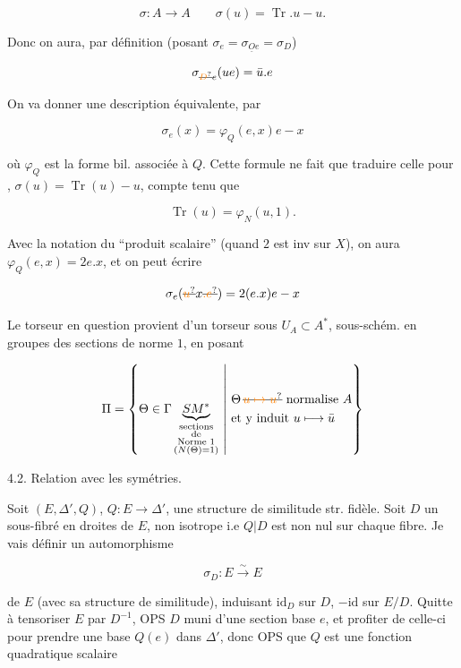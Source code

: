 \[
\sigma:A\longrightarrow A\qquad \sigma(u)=\operatorname{Tr}.u-u.
\]

Donc on aura, par définition (posant $\sigma_e=\sigma_{\underline Oe}=\sigma_D$)

\[
\sigma_{\deleted{\unsure{D}}e}(ue)=\bar u.e
\]

On va donner une description équivalente, par

\[
\sigma_e(x)=\varphi_Q(e,x)e-x
\]

où $\varphi_Q$ est la forme bil.  associée à $Q$. Cette formule ne fait que traduire celle pour , $\sigma(u)=\operatorname{Tr}(u)-u$, compte tenu que \unsure{$\{$}

\[
\operatorname{Tr}(u)=\varphi_N(u,1).
\]

Avec la notation du ``produit scalaire'' (quand $2$ est inv sur $X$), on aura $\varphi_Q(e,x)=2e.x$, et on peut écrire

\[
\sigma_e(\deleted{\unsure{u}}x\deleted{\unsure{.e}})=2(e.x)e-x
\]


 Le torseur en question provient d'un torseur \inserted{$\Pi$} sous  $U_A\subset A^*$, sous-schém. en groupes des sections de norme $1$, en posant

\[
\Pi=\left\{\Theta\in\Gamma\underbrace{SM^{*}}_{\substack{\text{sections}\\\text{de}\\\text{Norme }1\\(N(\Theta)=1)}}\ \middle|\ \begin{aligned}&\Theta\,\deleted{\unsure{u\mapsto u}}\ \text{normalise }A\\&\text{et y induit }u\longmapsto\bar u\end{aligned}\right\}
\]

4.2. Relation avec les symétries.

Soit $(E,\Delta',Q)$, $Q:E\longrightarrow\Delta'$, une structure de similitude str. fidèle. Soit $D$ un sous-fibré en droites de $E$,  non isotrope i.e $Q|D$ est non nul sur chaque fibre. Je vais définir un automorphisme

\[
\sigma_D:E\xrightarrow{\sim}E
\]

de $E$ (avec sa structure de similitude), induisant $\mathrm{id}_D$ sur $D$, $-\mathrm{id}$ sur $E/D$. Quitte à tensoriser $E$ par $D^{-1}$, OPS $D$ muni d'une section base $e$, et profiter de celle-ci pour prendre une base $Q(e)$ dans $\Delta'$, donc OPS que $Q$ est  une fonction quadratique scalaire


